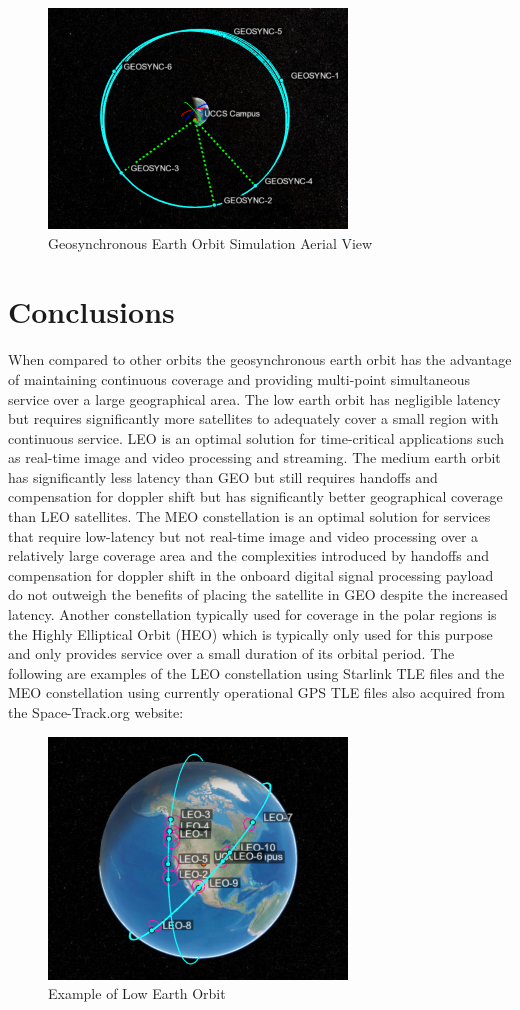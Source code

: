 \documentclass[conference]{IEEEtran}
\begin{document}
\begin{figure}[h]
\centerline{\includegraphics{constellation2copy.png}}
\caption{Geosynchronous Earth Orbit Simulation Aerial View}
\label{fig:4}
\end{figure}

\section{Conclusions}
When compared to other orbits the geosynchronous earth orbit has the advantage of maintaining continuous coverage and providing multi-point simultaneous service over a large geographical area. The low earth orbit has negligible latency but requires significantly more satellites to adequately cover a small region with continuous service. LEO is an optimal solution for time-critical applications such as real-time image and video processing and streaming. The medium earth orbit has significantly less latency than GEO but still requires handoffs and compensation for doppler shift but has significantly better geographical coverage than LEO satellites. The MEO constellation is an optimal solution for services that require low-latency but not real-time image and video processing over a relatively large coverage area and the complexities introduced by handoffs and compensation for doppler shift in the onboard digital signal processing payload do not outweigh the benefits of placing the satellite in GEO despite the increased latency. Another constellation typically used for coverage in the polar regions is the Highly Elliptical Orbit (HEO) which is typically only used for this purpose and only provides service over a small duration of its orbital period. The following are examples of the LEO constellation using Starlink TLE files and the MEO constellation using currently operational GPS TLE files also acquired from the Space-Track.org website:
\begin{figure}[h]
\centerline{\includegraphics{constellation3copy.png}}
\caption{Example of Low Earth Orbit}
\label{fig:5}
\end{figure}
\end{document}
